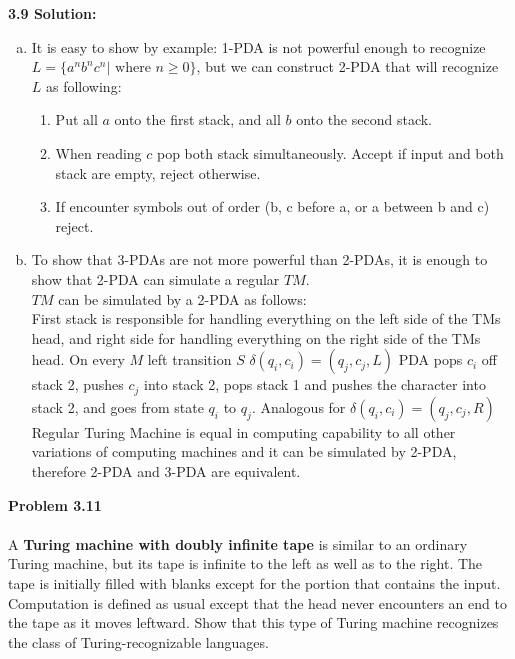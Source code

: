 \documentclass{article}
\newcommand\curl[1]{\{#1\}}
\newcommand{\problem}[1]{\large{\textbf{Problem #1}}\\}
\begin{document}
\textbf{3.9 Solution:}\\
\begin{enumerate}[a., leftmargin = 1.5cm]
\itemsep0em
\item It is easy to show by example: 1-PDA is not powerful enough to recognize $L = \curl{a^n b^n c^n |
\text{ where } n \geq 0}$, but we can construct 2-PDA that will recognize $L$ as following:
\begin{enumerate}[1., leftmargin = 1.5cm]
\itemsep0em
\item Put all $a$ onto the first stack, and all $b$ onto the second stack.
\item When reading $c$ pop both stack simultaneously. Accept if input and both stack are empty, reject otherwise.
\item If encounter symbols out of order (b, c before a, or a between b and c) reject.
\end{enumerate}
\item To show that 3-PDAs are not more powerful than 2-PDAs, it is enough to show that
2-PDA can simulate a regular $TM$. \\
$TM$ can be simulated by a 2-PDA as follows:\\
First stack is responsible for handling everything on the left side of the TMs head, and right side
for handling everything on the right side of the TMs head. On every $M$ left transition $S$
$\delta(q_i,c_i) = (q_j,c_j,L)$ PDA pops $c_i$ off stack 2, pushes $c_j$ into stack 2, pops stack 1 and 
pushes the character into stack 2, and goes from state $q_i$ to $q_j$. Analogous for $\delta(q_i,c_i) = (q_j,c_j,R)$\\

Regular Turing Machine is equal in computing capability to all other variations of computing machines and 
it can be simulated by 2-PDA, therefore 2-PDA and 3-PDA are equivalent.


\end{enumerate}
\problem{3.11} \\
A \textbf{Turing machine with doubly infinite tape} is similar to an ordinary
Turing machine, but its tape is infinite to the left as well as to the right. The tape
is initially filled with blanks except for the portion that contains the input. Computation is
defined as usual except that the head never encounters an end to the tape as it
moves leftward. Show that this type of Turing machine recognizes the class of Turing-recognizable 
languages. \\
\end{document}

